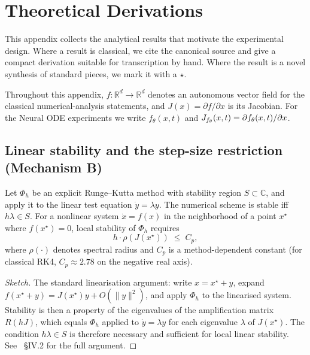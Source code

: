 
\appendix

\section{Theoretical Derivations}
\label{app:theory}

This appendix collects the analytical results that motivate the experimental design.
Where a result is classical, we cite the canonical source and give a compact
derivation suitable for transcription by hand. Where the result is a novel synthesis
of standard pieces, we mark it with a $\star$.

Throughout this appendix, $f \colon \mathbb{R}^d \to \mathbb{R}^d$ denotes an
autonomous vector field for the classical numerical-analysis statements, and
$J(x) = \partial f / \partial x$ is its Jacobian. For the Neural ODE experiments
we write $f_\theta(x,t)$ and $J_{f_\theta}(x,t) = \partial f_\theta(x,t)/\partial x$.

\subsection{Linear stability and the step-size restriction (Mechanism B)}
\label{app:stability}

\begin{theorem}
\label{thm:stability}
Let $\Phi_h$ be an explicit Runge--Kutta method with stability region $S \subset
\mathbb{C}$, and apply it to the linear test equation $\dot y = \lambda y$.
The numerical scheme is stable iff $h\lambda \in S$. For a nonlinear system
$\dot x = f(x)$ in the neighborhood of a point $x^\star$ where $f(x^\star) = 0$,
local stability of $\Phi_h$ requires
\begin{equation}
h \cdot \rho(J(x^\star)) \;\leq\; C_p,
\label{eq:stability-bound}
\end{equation}
where $\rho(\cdot)$ denotes spectral radius and $C_p$ is a method-dependent constant
(for classical RK4, $C_p \approx 2.78$ on the negative real axis).
\end{theorem}

\begin{proof}[Sketch]
The standard linearisation argument: write $x = x^\star + y$, expand
$f(x^\star + y) = J(x^\star) y + O(\|y\|^2)$, and apply $\Phi_h$ to the linearised
system. Stability is then a property of the eigenvalues of the amplification matrix
$R(hJ)$, which equals $\Phi_h$ applied to $\dot y = \lambda y$ for each eigenvalue
$\lambda$ of $J(x^\star)$. The condition $h\lambda \in S$ is therefore necessary and
sufficient for local linear stability. See~\cite{hairer1996solving} \S IV.2 for the
full argument.
\end{proof}

